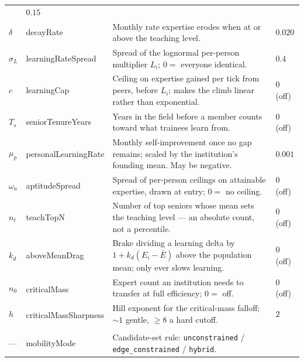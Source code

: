 \documentclass[11pt]{article}
\newcommand{\dither}{\textnormal{---}}
\newcommand{\dg}{\textsuperscript{\dag}}
\begin{document}
\begin{longtable}{L{1.6cm} K{2.9cm} L{6.8cm} S{2.5cm}}
  & $0.15$ \\
$\delta$ & decayRate & Monthly rate expertise erodes when at or above the
  teaching level.
  & $0.020$ \\
$\sigma_L$ & learningRateSpread & Spread of the lognormal per-person multiplier
  $L_i$; $0 = $ everyone identical.
  & $0.4$ \\
$c$ & learningCap & Ceiling on expertise gained per tick from peers, before
  $L_i$; makes the climb linear rather than exponential.
  & $0$ (off) \\
$T_s$ & seniorTenureYears & Years in the field before a member counts toward what
  trainees learn from.
  & $0$ (off) \\
$\mu_p$ & personalLearningRate & Monthly self-improvement once no gap remains;
  scaled by the institution's founding mean. May be negative.
  & $0.001$ \\
$\omega_a$ & aptitudeSpread & Spread of per-person ceilings on attainable
  expertise, drawn at entry; $0 = $ no ceiling.
  & $0$ (off) \\
$n_t$ & teachTopN & Number of top seniors whose mean sets the teaching level ---
  an absolute count, not a percentile.
  & $0$ (off) \\
$k_d$ & aboveMeanDrag & Brake dividing a learning delta by
  $1 + k_d(E_i - \bar E)$ above the population mean; only ever slows learning.
  & $0$ (off) \\
$n_0$ & criticalMass\dg & Expert count an institution needs to transfer at full
  efficiency; $0 = $ off.
  & $0$ (off) \\
$h$ & criticalMassSharpness\dg & Hill exponent for the critical-mass falloff;
  ${\sim}1$ gentle, $\ge 8$ a hard cutoff.
  & $2$ \\
\addlinespace
{}\\[2pt]
\dither & mobilityMode & Candidate-set rule: \texttt{unconstrained} /
  \texttt{edge\_constrained} / \texttt{hybrid}.

\end{longtable}
\end{document}
